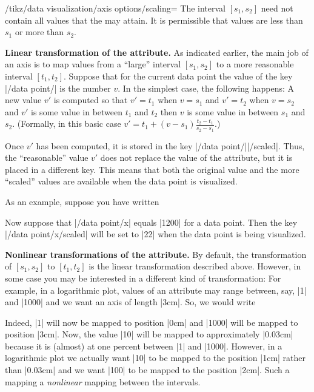 \begin{key}{/tikz/data visualization/axis options/scaling=}
    The interval  $[s_1,s_2]$ need not contain all values that the
     may attain. It is permissible that values are less than
    $s_1$ or more than $s_2$.


    \medskip
    \textbf{Linear transformation of the attribute.}
    As indicated earlier, the main job of an axis is to map values from a
    ``large'' interval $[s_1,s_2]$ to a more reasonable interval $[t_1,t_2]$.
    Suppose that for the current data point the value of the key
    |/data point/| is the number $v$. In the simplest case, the
    following happens: A new value $v'$ is computed so that $v' = t_1$ when
    $v=s_1$ and $v'=t_2$ when $v=s_2$ and $v'$ is some value in between $t_1$
    and $t_2$ then $v$ is some value in between $s_1$ and $s_2$. (Formally, in
    this basic case $v' = t_1 + (v-s_1)\frac{t_2-t_1}{s_2-s_1}$.)

    Once $v'$ has been computed, it is stored in the key
    |/data point/||/scaled|. Thus, the ``reasonable'' value
    $v'$ does not replace the value of the attribute, but it is placed in a
    different key. This means that both the original value and the more
    ``scaled'' values are available when the data point is visualized.

    As an example, suppose you have written
\begin{codeexample}
\end{codeexample}
    Now suppose that |/data point/x| equals |1200| for a data point. Then the
    key |/data point/x/scaled| will be set to |22| when the data point is being
    visualized.


    \medskip
    \textbf{Nonlinear transformations of the attribute.}
    By default, the transformation of $[s_1,s_2]$ to $[t_1,t_2]$ is the linear
    transformation described above. However, in some case you may be interested
    in a different kind of transformation: For example, in a logarithmic plot,
    values of an attribute may range between, say, |1| and |1000| and we want
    an axis of length |3cm|. So, we would write
\begin{codeexample}
\end{codeexample}
    Indeed, |1| will now be mapped to position |0cm| and |1000| will be mapped
    to position |3cm|. Now, the value |10| will be mapped to approximately
    |0.03cm| because it is (almost) at one percent between |1| and |1000|.
    However, in a logarithmic plot we actually want |10| to be mapped to the
    position |1cm| rather than |0.03cm| and we want |100| to be mapped to the
    position |2cm|. Such a mapping a \emph{nonlinear} mapping between the
    intervals.


\end{key}
